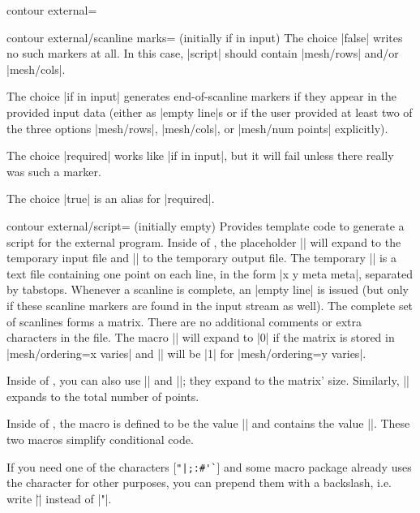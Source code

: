 {{\begin{plottype}[/pgfplots]{contour external=\textcolor{black}{}}
\begin{pgfplotskey}{contour external/scanline marks= (initially if in input)}
		The choice |false| writes no such markers at all. In this case, |script| should contain |mesh/rows| and/or |mesh/cols|.

		The choice |if in input| generates end-of-scanline markers if they appear in the provided input data (either as |empty line|s or if the user provided at least two of the three options |mesh/rows|, |mesh/cols|, or |mesh/num points| explicitly).

		The choice |required| works like |if in input|, but it will fail unless there really was such a marker.

		The choice |true| is an alias for |required|.
	\end{pgfplotskey}

	\begin{pgfplotskey}{contour external/script= (initially empty)}
		Provides template code to generate a script for the external program. Inside of , the placeholder |\infile| will expand to the temporary input file and |\outfile| to the temporary output file. The temporary |\infile| is a text file containing one point on each line, in the form |x y meta meta|, separated by tabstops. Whenever a scanline is complete, an |empty line| is issued (but only if these scanline markers are found in the input stream as well). The complete set of scanlines forms a matrix. There are no additional comments or extra characters in the file. The macro |\ordering| will expand to |0| if the matrix is stored in |mesh/ordering=x varies| and |\ordering| will be |1| for |mesh/ordering=y varies|.

		Inside of , you can also use || and ||; they expand to the matrix' size. Similarly, || expands to the total number of points.

		Inside of , the macro \declareandlabel{\thecontournumber} is defined to be the value || and \declareandlabel{\thecontourlevels} contains the value ||. These two macros simplify conditional code.

		If you need one of the characters [\verb!"|;:#'`!] and some macro package already uses the character for other purposes, you can prepend them with a backslash, i.e. write |\"| instead of |"|.
	\end{pgfplotskey}


\end{plottype}}}
